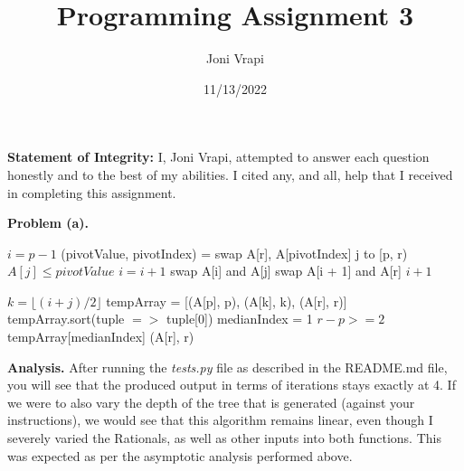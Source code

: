 \documentclass{article}
\title{Programming Assignment 3}
\author{Joni Vrapi}
\date{11/13/2022}
\begin{document}
\maketitle

\textbf{Statement of Integrity:} I, Joni Vrapi, attempted to answer each question honestly and to the best of my abilities. I cited any, and all, help that I received in completing this assignment.

\hfill

\textbf{Problem (a).} 

\begin{codebox}
    \li $i = p - 1$
    \li
    \li (pivotValue, pivotIndex) = 
    \li swap A[r], A[pivotIndex]
    \li
    \li \For j to [p, r) \Do
    \li \If $A[j] \leq pivotValue$ \Then
    \li $i = i + 1$
    \li swap A[i] and A[j] \End \End
    \li
    \li swap A[i + 1] and A[r]
    \li
    \li \Return $i + 1$
\end{codebox}

\begin{codebox}
    \li $k = \lfloor (i + j)/2 \rfloor$
    \li
    \li tempArray = [(A[p], p), (A[k], k), (A[r], r)]
    \li tempArray.sort(tuple $=>$ tuple[0])
    \li
    \li medianIndex = 1
    \li
    \li \If $r - p >= 2$ \Then
    \li \Return tempArray[medianIndex]
    \li \Else 
    \li \Return (A[r], r) \End
\end{codebox}

\hfill

\textbf{Analysis.} After running the \emph{tests.py} file as described in the README.md file, you will see that the produced output in terms of iterations stays exactly at 4. If we were to also vary the depth of the tree that is generated (against your instructions), we would see that this algorithm remains linear, even though I severely varied the Rationals, as well as other inputs into both functions. This was expected as per the asymptotic analysis performed above. 

\newpage
 

\end{document}
